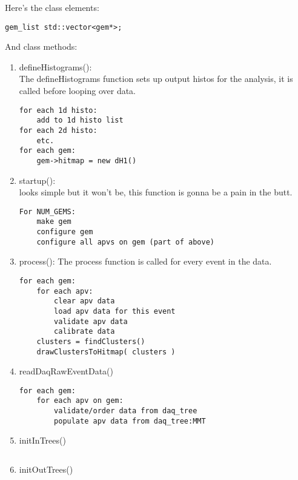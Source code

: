 \documentclass[11pt]{article}
\begin{document}
	Here's the class elements:
	\begin{lstlisting} 
gem_list std::vector<gem*>; 

	\end{lstlisting}
	
	And class methods:
	\begin{enumerate}
		\item defineHistograms():
		\\The defineHistograms function sets up output histos for the analysis, it is called before looping over data.
		\begin{lstlisting}
for each 1d histo:
	add to 1d histo list
for each 2d histo:
	etc.
for each gem:
	gem->hitmap = new dH1()
		\end{lstlisting}
		
		\item startup():\\
		looks simple but it won't be, this function is gonna be a pain in the butt.
		\begin{lstlisting}
For NUM_GEMS:
	make gem
	configure gem 
	configure all apvs on gem (part of above)
		\end{lstlisting}
		
		\item process(): 
		The process function is called for every event in the data. 
		\begin{lstlisting}
for each gem:
	for each apv:
		clear apv data
		load apv data for this event
		validate apv data
		calibrate data
	clusters = findClusters()
	drawClustersToHitmap( clusters )		
		\end{lstlisting}
		
		\item readDaqRawEventData()
		\begin{lstlisting}
for each gem:
	for each apv on gem:
		validate/order data from daq_tree	
		populate apv data from daq_tree:MMT
		\end{lstlisting}
		
		\item initInTrees()
		\begin{lstlisting}
		\end{lstlisting}
		
		\item initOutTrees()
		\begin{lstlisting}
		\end{lstlisting}
		
	\end{enumerate}
	
\end{document}

